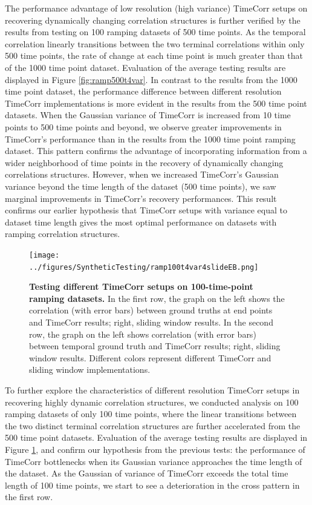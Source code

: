 \documentclass[11pt]{article}
\begin{document}
\begin{enumerate}
The performance advantage of low resolution (high variance) TimeCorr setups on recovering dynamically changing correlation structures is further verified by the results from testing on 100 ramping datasets of 500 time points. As the temporal correlation linearly transitions between the two terminal correlations within only 500 time points, the rate of change at each time point is much greater than that of the 1000 time point dataset. Evaluation of the average testing results are displayed in Figure \ref{fig:ramp500t4var}. In contrast to the results from the 1000 time point dataset, the performance difference between different resolution TimeCorr implementations is more evident in the results from the 500 time point datasets. When the Gaussian variance of TimeCorr is increased from 10 time points to 500 time points and beyond, we observe greater improvements in TimeCorr's performance than in the results from the 1000 time point ramping dataset. This pattern confirms the advantage of incorporating information from a wider neighborhood of time points in the recovery of dynamically changing correlations structures. However, when we increased TimeCorr's Gaussian variance beyond the time length of the dataset (500 time points), we saw marginal improvements in TimeCorr's recovery performances. This result confirms our earlier hypothesis that TimeCorr setups with variance equal to dataset time length gives the most optimal performance on datasets with ramping correlation structures.


\begin{figure}[!htb]
\texttt{[image: ../figures/SyntheticTesting/ramp100t4var4slideEB.png]}
\caption{\textbf{Testing different TimeCorr setups on 100-time-point ramping datasets.} In the first row, the graph on the left shows the correlation (with error bars) between ground truths at end points and TimeCorr results; right, sliding window results. In the second row, the graph on the left shows correlation (with error bars) between temporal ground truth and TimeCorr results; right, sliding window results. Different colors represent different TimeCorr and sliding window implementations.}
\label{fig:ramp100t4var}
\end{figure}

To further explore the characteristics of different resolution TimeCorr setups in recovering highly dynamic correlation structures, we conducted analysis on 100 ramping datasets of only 100 time points, where the linear transitions between the two distinct terminal correlation structures are further accelerated from the 500 time point datasets. Evaluation of the average testing results are displayed in Figure \ref{fig:ramp100t4var}, and confirm our hypothesis from the previous tests: the performance of TimeCorr bottlenecks when its Gaussian variance approaches the time length of the dataset. As the Gaussian of variance of TimeCorr exceeds the total time length of 100 time points, we start to see a deterioration in the cross pattern in the first row.


\end{enumerate}
\end{document}
